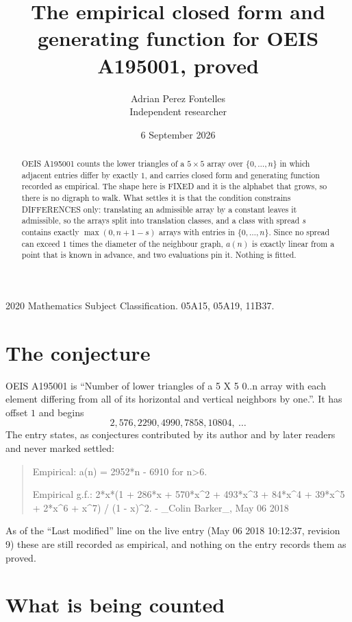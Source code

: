 \documentclass[11pt,a4paper]{article}
\title{The empirical closed form and generating function for OEIS A195001, proved}
\author{Adrian Perez Fontelles\\ \small Independent researcher}
\date{6 September 2026}
\theoremstyle{plain}
\theoremstyle{definition}
\begin{document}
\maketitle

\begin{abstract}
OEIS A195001 counts the lower triangles of a $5\times5$ array over $\{0,\dots,n\}$ in which
adjacent entries differ by exactly $1$, and carries closed form and generating function recorded as empirical. The shape here is FIXED
and it is the alphabet that grows, so there is no digraph to walk. What settles it is that the
condition constrains DIFFERENCES only: translating an admissible array by a constant leaves it
admissible, so the arrays split into translation classes, and a class with spread $s$ contains
exactly $\max(0,n+1-s)$ arrays with entries in $\{0,\dots,n\}$. Since no spread can exceed
$1$ times the diameter of the neighbour graph, $a(n)$ is exactly linear from a point that is
known in advance, and two evaluations pin it. Nothing is fitted.
\end{abstract}

\noindent\small 2020 Mathematics Subject Classification. 05A15, 05A19, 11B37.\normalsize

\section{The conjecture}

OEIS A195001 is ``Number of lower triangles of a 5 X 5 0..n array with each element differing from all of its horizontal and vertical neighbors by one.''. It has offset $1$ and begins
\[
2, 576, 2290, 4990, 7858, 10804,\ \dots
\]
The entry states, as conjectures contributed by its author and by later readers and never
marked settled:
\begin{quote}
Empirical: a(n) = 2952*n - 6910 for n>6.

Empirical g.f.: 2*x*(1 + 286*x + 570*x\^{}2 + 493*x\^{}3 + 84*x\^{}4 + 39*x\^{}5 + 2*x\^{}6 + x\^{}7) / (1 - x)\^{}2. - \_Colin Barker\_, May 06 2018
\end{quote}
As of the ``Last modified'' line on the live entry (May 06 2018 10:12:37, revision 9) these are still
recorded as empirical, and nothing on the entry records them as proved.

\section{What is being counted}
\end{document}
